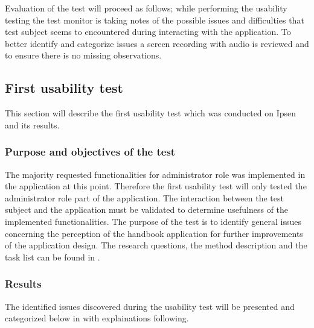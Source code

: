 Evaluation of the test will proceed as follows; while performing the usability testing the test monitor is taking notes of the possible issues and difficulties that test subject seems to encountered during interacting with the application. 
To better identify and categorize issues a screen recording with audio is reviewed and to ensure there is no missing observations.

\subsection{First usability test}
This section will describe the first usability test which was conducted on Ipsen and its results.

\subsubsection{Purpose and objectives of the test}
The majority requested functionalities for administrator role was implemented in the application at this point. 
Therefore the first usability test will only tested the administrator role part of the application.
The interaction between the test subject and the application must be validated to determine usefulness of the implemented functionalities. 
The purpose of the test is to identify general issues concerning the perception of the handbook application for further improvements of the application design.
The research questions, the method description and the task list can be found in .

\subsubsection{Results}
The identified issues discovered during the usability test will be presented and categorized below in  with explainations following. 

